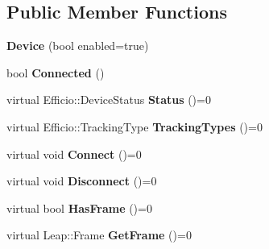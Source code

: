 \subsection*{Public Member Functions}
\begin{DoxyCompactItemize}
\item 
{\bfseries Device} (bool enabled=true)\hypertarget{class_efficio_1_1_device_a03b5d83501b593eced3d011954ca265f}{}\label{class_efficio_1_1_device_a03b5d83501b593eced3d011954ca265f}

\item 
bool {\bfseries Connected} ()\hypertarget{class_efficio_1_1_device_a51228fd0878a8514a28844a934a95625}{}\label{class_efficio_1_1_device_a51228fd0878a8514a28844a934a95625}

\item 
virtual Efficio\+::\+Device\+Status {\bfseries Status} ()=0\hypertarget{class_efficio_1_1_device_a4fc83f754676de245976e1d1bb08b392}{}\label{class_efficio_1_1_device_a4fc83f754676de245976e1d1bb08b392}

\item 
virtual Efficio\+::\+Tracking\+Type {\bfseries Tracking\+Types} ()=0\hypertarget{class_efficio_1_1_device_ab655d0b6f140954de99fc4f187aca261}{}\label{class_efficio_1_1_device_ab655d0b6f140954de99fc4f187aca261}

\item 
virtual void {\bfseries Connect} ()=0\hypertarget{class_efficio_1_1_device_a852ea0bc779e5ec543b2a1162986ef7c}{}\label{class_efficio_1_1_device_a852ea0bc779e5ec543b2a1162986ef7c}

\item 
virtual void {\bfseries Disconnect} ()=0\hypertarget{class_efficio_1_1_device_a8fb17a0b95255e8947cca9dcddcff26c}{}\label{class_efficio_1_1_device_a8fb17a0b95255e8947cca9dcddcff26c}

\item 
virtual bool {\bfseries Has\+Frame} ()=0\hypertarget{class_efficio_1_1_device_a43eda953d99df9ee4df66df44c205773}{}\label{class_efficio_1_1_device_a43eda953d99df9ee4df66df44c205773}

\item 
virtual Leap\+::\+Frame {\bfseries Get\+Frame} ()=0\hypertarget{class_efficio_1_1_device_a82a46c74f3f75c9b2b08edbe6d2b5477}{}\label{class_efficio_1_1_device_a82a46c74f3f75c9b2b08edbe6d2b5477}

\end{DoxyCompactItemize}
